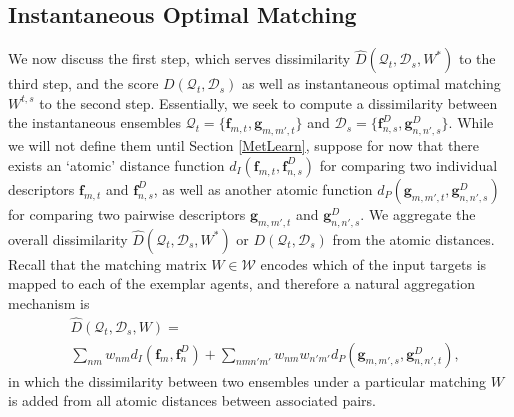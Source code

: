 \subsection{Instantaneous Optimal Matching}
\label{agg}

We now discuss the first step, which serves dissimilarity $\hat{D}(\mathcal{Q}_{t}, \mathcal{D}_{s}, W^{*})$ to the third step, and the score $D(\mathcal{Q}_{t}, \mathcal{D}_{s})$ as well as instantaneous optimal matching $W^{t,s}$ to the second step. Essentially, we seek to compute a dissimilarity between the instantaneous ensembles $\mathcal{Q}_{t}=\{\mathbf{f}_{m,t},\mathbf{g}_{m,m',t}\}$ and $\mathcal{D}_{s}=\{\mathbf{f}^{D}_{n,s},\mathbf{g}^{D}_{n,n',s}\}$. While we will not define them until Section \ref{MetLearn}, suppose for now that there exists an `atomic' distance function $d_{I}(\mathbf{f}_{m,t}, \mathbf{f}^{D}_{n,s}) $ for comparing two individual descriptors $\mathbf{f}_{m,t}$ and $\mathbf{f}^{D}_{n,s}$, as well as another atomic function $d_{P}(\mathbf{g}_{m,m',t}, \mathbf{g}^{D}_{n,n',s}) $ for comparing two pairwise descriptors $\mathbf{g}_{m,m',t}$ and $\mathbf{g}^{D}_{n,n',s}$. We aggregate the overall dissimilarity $\hat{D}(\mathcal{Q}_{t}, \mathcal{D}_{s}, W^{*})$ or $D(\mathcal{Q}_{t}, \mathcal{D}_{s})$ from the atomic distances. Recall that the matching matrix $W\in\mathcal{W}$ encodes which of the input targets is mapped to each of the exemplar agents, and therefore a natural aggregation mechanism is 
\begin{equation}
\begin{split}
&\hat{D}(\mathcal{Q}_{t}, \mathcal{D}_{s}, W)=\\
&\sum_{nm}w_{nm}d_{I}(\mathbf{f}_{m}, \mathbf{f}^{D}_{n})+\sum_{nmn'm'}w_{nm}w_{n'm'}d_{P}(\mathbf{g}_{m,m',s}, \mathbf{g}^{D}_{n,n',t}),
\end{split}
\end{equation}
in which the dissimilarity between two ensembles under a particular matching $W$ is added from all atomic distances between associated pairs.

